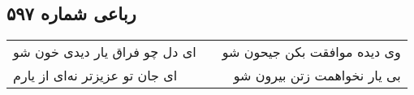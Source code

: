 \begin{center}
\section*{رباعی شماره ۵۹۷}
\label{sec:sh597}
\begin{longtable}{l p{0.5cm} r}
ای دل چو فراق یار دیدی خون شو
&&
وی دیده موافقت بکن جیحون شو
\\
ای جان تو عزیزتر نه‌ای از یارم
&&
بی یار نخواهمت زتن بیرون شو
\\
\end{longtable}
\end{center}
